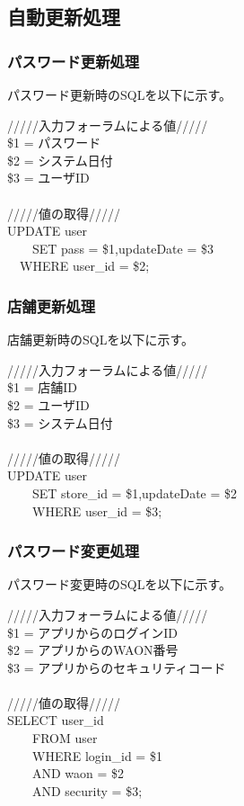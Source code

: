 \documentclass[a4j]{jarticle}
\begin{document}
\subsection{自動更新処理}

\subsubsection{パスワード更新処理}
パスワード更新時のSQLを以下に示す。
\begin{screen}
  /////入力フォーラムによる値/////\\
  \$1 = パスワード\\
  \$2 = システム日付\\
  \$3 = ユーザID\\
  \\
  /////値の取得/////\\
  UPDATE user\\
  　　SET pass = \$1,updateDate = \$3\\
  　WHERE user\_id = \$2;
\end{screen}


\subsubsection{店舗更新処理}
店舗更新時のSQLを以下に示す。
\begin{screen}
  /////入力フォーラムによる値/////\\
  \$1 = 店舗ID\\
  \$2 = ユーザID\\
  \$3 = システム日付\\
  \\
  /////値の取得/////\\
  UPDATE user\\
  　　SET store\_id = \$1,updateDate = \$2\\
  　　WHERE user\_id = \$3;
\end{screen}


\subsubsection{パスワード変更処理}
パスワード変更時のSQLを以下に示す。
\begin{screen}
  /////入力フォーラムによる値/////\\
  \$1 = アプリからのログインID\\
  \$2 = アプリからのWAON番号\\
  \$3 = アプリからのセキュリティコード\\
  \\
  /////値の取得/////\\
  SELECT user\_id\\
  　　FROM user\\
  　　WHERE login\_id = \$1\\
  　　AND waon = \$2\\
  　　AND security = \$3;
\end{screen}
\end{document}
